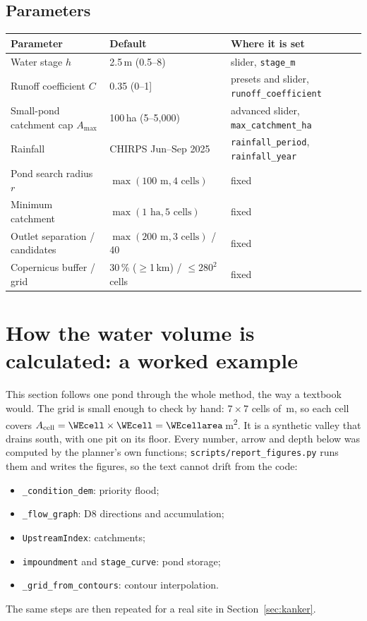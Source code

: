 \documentclass[11pt,a4paper]{article}
\newcommand{\code}[1]{\texttt{#1}}
\newcommand{\mtwo}{m\textsuperscript{2}}
\begin{document}
\subsection{Parameters}
\begin{tabularx}{\linewidth}{@{}L{58mm}L{34mm}Y@{}}
\toprule
\textbf{Parameter} & \textbf{Default} & \textbf{Where it is set}\\
\midrule
Water stage $h$ & 2.5\,m (0.5--8) & slider, \code{stage\_m}\\
Runoff coefficient $C$ & 0.35 (0--1] & presets and slider, \code{runoff\_coefficient}\\
Small-pond catchment cap $A_{\max}$ & 100\,ha (5--5,000) & advanced slider, \code{max\_catchment\_ha}\\
Rainfall & CHIRPS Jun--Sep 2025 & \code{rainfall\_period}, \code{rainfall\_year}\\
Pond search radius $r$ & $\max(100\text{ m},4\text{ cells})$ & fixed\\
Minimum catchment & $\max(1\text{ ha},5\text{ cells})$ & fixed\\
Outlet separation / candidates & $\max(200\text{ m},3\text{ cells})$ / 40 & fixed\\
Copernicus buffer / grid & 30\,\% ($\geq$1\,km) / $\leq280^2$ cells & fixed\\
\bottomrule
\end{tabularx}

\clearpage
\section{How the water volume is calculated: a worked example}
\label{sec:worked}
This section follows one pond through the whole method, the way a textbook would. The grid is small enough to check by hand: $7\times7$ cells of \WEcell\,m, so each cell covers $A_{\mathrm{cell}}=\WEcell\times\WEcell=\WEcellarea$\,\mtwo. It is a synthetic valley that drains south, with one pit on its floor. Every number, arrow and depth below was computed by the planner's own functions; \code{scripts/report\_figures.py} runs them and writes the figures, so the text cannot drift from the code:
\begin{itemize}
\item \code{\_condition\_dem}: priority flood;
\item \code{\_flow\_graph}: D8 directions and accumulation;
\item \code{UpstreamIndex}: catchments;
\item \code{impoundment} and \code{stage\_curve}: pond storage;
\item \code{\_grid\_from\_contours}: contour interpolation.
\end{itemize}
The same steps are then repeated for a real site in Section~\ref{sec:kanker}.
\end{document}
